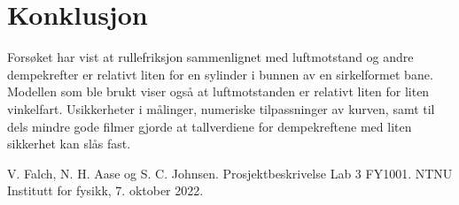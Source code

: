 \documentclass[5p]{elsarticle}
\begin{document}

\section{Konklusjon}
Forsøket har vist at rullefriksjon sammenlignet med luftmotstand og andre dempekrefter er relativt liten for en sylinder i bunnen av en sirkelformet bane. 
Modellen som ble brukt viser også at luftmotstanden er relativt liten for liten vinkelfart. Usikkerheter i målinger, numeriske tilpassninger av kurven, samt til dels mindre gode filmer gjorde at tallverdiene for dempekreftene med liten sikkerhet kan slås fast.

\begin{thebibliography}{5}
V. Falch, N. H. Aase og S. C. Johnsen. Prosjektbeskrivelse Lab 3 FY1001. NTNU Institutt for fysikk, 7. oktober 2022.
\end{thebibliography}
\end{document}
